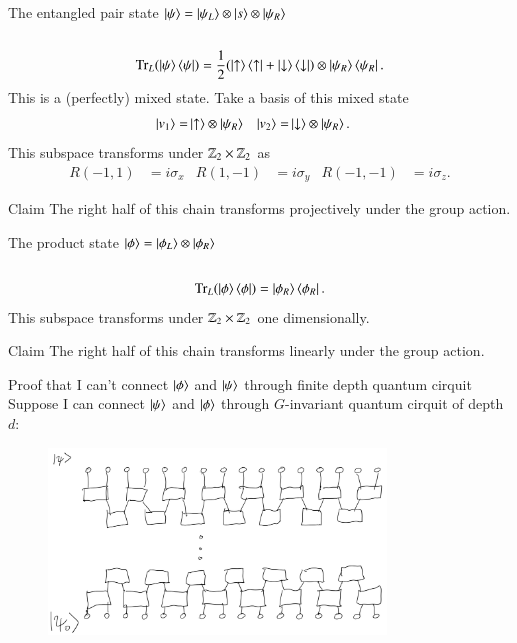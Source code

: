 \documentclass{beamer}
\begin{document}
\begin{frame}{The entangled pair state}
	$\ket{\psi}=\ket{\psi_L}\otimes\ket{s}\otimes\ket{\psi_R}$ \\
	\\
	\pause
	\begin{equation*}
		\textrm{Tr}_L(\ket{\psi}\bra{\psi})=\frac{1}{2}(\ket{\uparrow}\bra{\uparrow}+\ket{\downarrow}\bra{\downarrow})\otimes\ket{\psi_R}\bra{\psi_R}.
	\end{equation*}
	This is a (perfectly) mixed state. Take a basis of this mixed state
	\begin{align*}
		\ket{v_1}=&\ket{\uparrow}\otimes\ket{\psi_R}&\ket{v_2}=&\ket{\downarrow}\otimes\ket{\psi_R}.
	\end{align*}
	\pause
	This subspace transforms under $\mathbb{Z}_2\times\mathbb{Z}_2$ as
	\begin{align*}
		R(-1,1)&=i\sigma_x&R(1,-1)&=i\sigma_y&R(-1,-1)&=i\sigma_z.
	\end{align*}
	\begin{block}{Claim}
		The right half of this chain transforms projectively under the group action.
	\end{block}
\end{frame}

\begin{frame}{The product state}
	$\ket{\phi}=\ket{\phi_{L}}\otimes\ket{\phi_{R}}$ \\
	\\
	\pause
	\begin{equation*}
		\textrm{Tr}_L(\ket{\phi}\bra{\phi})=\ket{\phi_{R}}\bra{\phi_{R}}.
	\end{equation*}
	\pause
	This subspace transforms under $\mathbb{Z}_2\times\mathbb{Z}_2$ one dimensionally.
	\begin{block}{Claim}
		The right half of this chain transforms linearly under the group action.
	\end{block}
\end{frame}

\begin{frame}{Proof that I can't connect $\ket{\phi}$ and $\ket{\psi}$ through finite depth quantum cirquit}
	Suppose I can connect $\ket{\psi}$ and $\ket{\phi}$ through $G$-invariant quantum cirquit of depth $d$:
	\begin{figure}
		\center
		\includegraphics[width=0.8\textwidth]{Figures/ConnectingPsiAndPsi0Proof.png}
	\end{figure}
\end{frame}
\end{document}
